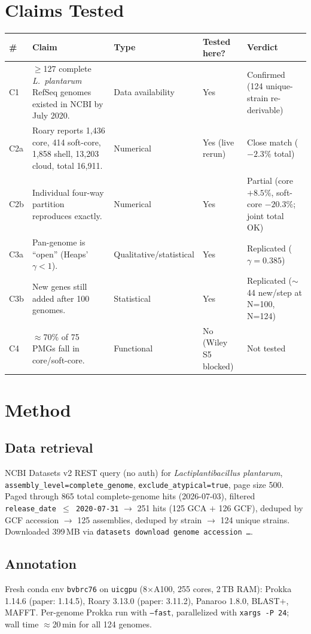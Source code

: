 \documentclass[11pt,letterpaper]{article}
\begin{document}
\section{Claims Tested}

\begin{longtable}{p{0.5cm}p{6cm}p{2cm}p{2.2cm}p{2.5cm}}
\toprule
\# & Claim & Type & Tested here? & Verdict \\
\midrule
C1 & $\geq$127 complete \emph{L.\ plantarum} RefSeq genomes existed in NCBI by July 2020. & Data availability & Yes & Confirmed (124 unique-strain re-derivable) \\
C2a & Roary reports 1{,}436 core, 414 soft-core, 1{,}858 shell, 13{,}203 cloud, total 16{,}911. & Numerical & Yes (live rerun) & Close match ($-2.3\%$ total) \\
C2b & Individual four-way partition reproduces exactly. & Numerical & Yes & Partial (core $+8.5\%$, soft-core $-20.3\%$; joint total OK) \\
C3a & Pan-genome is ``open'' (Heaps' $\gamma < 1$). & Qualitative/statistical & Yes & Replicated ($\gamma = 0.385$) \\
C3b & New genes still added after 100 genomes. & Statistical & Yes & Replicated ($\sim$44 new/step at N=100, N=124) \\
C4  & $\approx$70\% of 75 PMGs fall in core/soft-core. & Functional & No (Wiley S5 blocked) & Not tested \\
\bottomrule
\end{longtable}

\section{Method}

\subsection{Data retrieval}
NCBI Datasets v2 REST query (no auth) for \emph{Lactiplantibacillus plantarum},
\texttt{assembly\_level=complete\_genome}, \texttt{exclude\_atypical=true}, page size 500.
Paged through 865 total complete-genome hits (2026-07-03), filtered
\texttt{release\_date $\le$ 2020-07-31} $\to$ 251 hits (125 GCA $+$ 126 GCF),
deduped by GCF accession $\to$ 125 assemblies, deduped by strain $\to$ 124 unique strains.
Downloaded 399\,MB via \texttt{datasets download genome accession \dots}.

\subsection{Annotation}
Fresh conda env \texttt{bvbrc76} on \texttt{uicgpu} (8$\times$A100, 255 cores, 2\,TB RAM):
Prokka 1.14.6 (paper: 1.14.5), Roary 3.13.0 (paper: 3.11.2), Panaroo 1.8.0, BLAST$+$, MAFFT.
Per-genome Prokka run with \texttt{--fast}, parallelized with \texttt{xargs -P 24};
wall time $\approx$20\,min for all 124 genomes.
\end{document}
